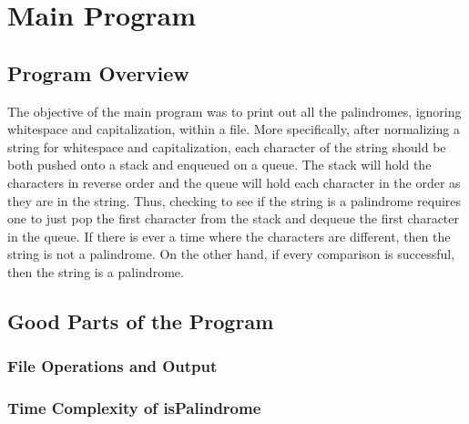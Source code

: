 \documentclass[letterpaper, 10pt,DIV=13]{scrartcl}
\numberwithin{equation}{section} %
\numberwithin{figure}{section} %
\numberwithin{table}{section} %
\begin{document}
\section{Main Program}
\subsection{Program Overview}
The objective of the main program was to print out all the palindromes, ignoring whitespace and capitalization, within a file. More specifically, after normalizing
a string for whitespace and capitalization, each character of the string should be both pushed onto a stack and enqueued on a queue. The stack will hold the
characters in reverse order and the queue will hold each character in the order as they are in the string. Thus, checking to see if the string is a palindrome requires
one to just pop the first character from the stack and dequeue the first character in the queue. If there is ever a time where the characters are different, then
the string is not a palindrome. On the other hand, if every comparison is successful, then the string is a palindrome.


\subsection{Good Parts of the Program}
\subsubsection{File Operations and Output}

\subsubsection{Time Complexity of isPalindrome}



\end{document}

